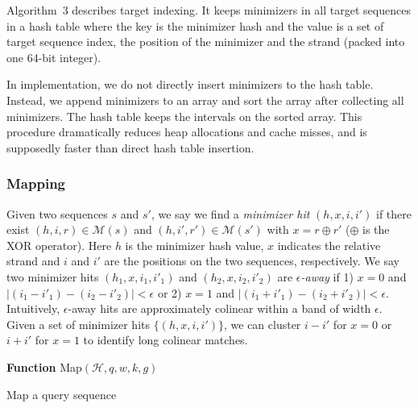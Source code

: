 \documentclass{bioinfo}
\begin{document}
\begin{methods}
Algorithm~3 describes target indexing. It keeps minimizers in all target
sequences in a hash table where the key is the minimizer hash and the value is
a set of target sequence index, the position of the minimizer and the strand
(packed into one 64-bit integer).

In implementation, we do not directly insert minimizers to the hash table.
Instead, we append minimizers to an array and sort the array after collecting
all minimizers. The hash table keeps the intervals on the sorted array. This
procedure dramatically reduces heap allocations and cache misses, and is
supposedly faster than direct hash table insertion.

\subsubsection{Mapping}

Given two sequences $s$ and $s'$, we say we find a \emph{minimizer hit}
$(h,x,i,i')$ if there exist $(h,i,r)\in\mathcal{M}(s)$ and
$(h,i',r')\in\mathcal{M}(s')$ with $x=r\oplus r'$ ($\oplus$ is the XOR
operator). Here $h$ is the minimizer hash value, $x$ indicates the relative
strand and $i$ and $i'$ are the positions on the two sequences, respectively.
We say two minimizer hits $(h_1,x,i_1,i'_1)$ and $(h_2,x,i_2,i'_2)$ are
\emph{$\epsilon$-away} if 1) $x=0$ and $|(i_1-i'_1)-(i_2-i'_2)|<\epsilon$
or 2) $x=1$ and $|(i_1+i'_1)-(i_2+i'_2)|<\epsilon$. Intuitively,
$\epsilon$-away hits are approximately colinear within a band of width
$\epsilon$.  Given a set of minimizer hits $\{(h,x,i,i')\}$, we can cluster
$i-i'$ for $x=0$ or $i+i'$ for $x=1$ to identify long colinear matches.

\begin{algorithm}[ht]
\DontPrintSemicolon
\footnotesize
{}
\BlankLine
\textbf{Function} {\sc Map}$(\mathcal{H},q,w,k,g)$
\caption{Map a query sequence}
\end{algorithm}


\end{methods}
\end{document}
